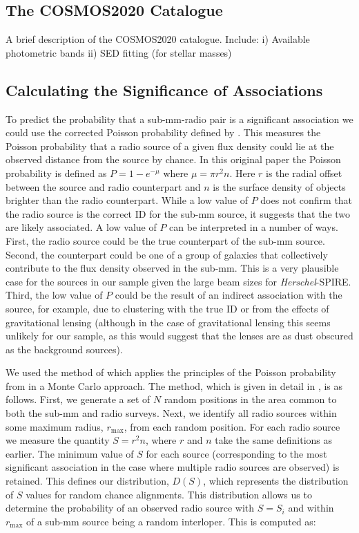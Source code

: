 \subsection{The COSMOS2020 Catalogue}

{\color{red}A brief description of the COSMOS2020 catalogue. Include: i) Available photometric bands ii) SED fitting (for stellar masses)}

\subsection{Calculating the Significance of Associations}
\label{sec:radio_significance}

To predict the probability that a sub-mm-radio pair is a significant association we could use the corrected Poisson probability defined by \citealt{Downes_1986}. This measures the Poisson probability that a radio source of a given flux density could lie at the observed distance from the source by chance. In this original paper the Poisson probability is defined as $P = 1-e^{-\mu}$ where $\mu = \pi r^2n$. Here $r$ is the radial offset between the source and radio counterpart and $n$ is the surface density of objects brighter than the radio counterpart. While a low value of $P$ does not confirm that the radio source is the correct ID for the sub-mm source, it suggests that the two are likely associated. A low value of $P$ can be interpreted in a number of ways. First, the radio source could be the true counterpart of the sub-mm source. Second, the counterpart could be one of a group of galaxies that collectively contribute to the flux density observed in the sub-mm. This is a very plausible case for the sources in our sample given the large beam sizes for \textit{Herschel}-SPIRE. Third, the low value of $P$ could be the result of an indirect association with the source, for example, due to clustering with the true ID or from the effects of gravitational lensing (although in the case of gravitational lensing this seems unlikely for our sample, as this would suggest that the lenses are as dust obscured as the background sources).

We used the method of \citealt{Lilly_1999} which applies the principles of the Poisson probability from \citealt{Downes_1986} in a Monte Carlo approach. The method, which is given in detail in \citealt{Dye_2009}, is as follows. First, we generate a set of $N$ random positions in the area common to both the sub-mm and radio surveys. Next, we identify all radio sources within some maximum radius, $r_{\textrm{max}}$, from each random position. For each radio source we measure the quantity $S = r^2n$, where $r$ and $n$ take the same definitions as earlier. The minimum value of $S$ for each source (corresponding to the most significant association in the case where multiple radio sources are observed) is retained. This defines our distribution, $D(S)$, which represents the distribution of $S$ values for random chance alignments. This distribution allows us to determine the probability of an observed radio source with $S = S_i$ and within $r_{\textrm{max}}$ of a sub-mm source being a random interloper. This is computed as:

